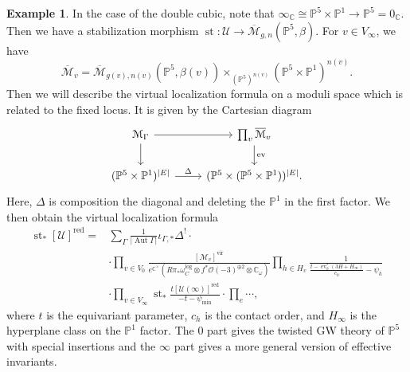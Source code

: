 \documentclass[10pt,oldfontcommands,oneside]{memoir}
\theoremstyle{definition}
\newtheorem{exm}[thm]{Example}
\theoremstyle{remark}
\theoremstyle{plain}
\theoremstyle{definition}
\theoremstyle{remark}
\newcommand{\C}{\mathbb{C}}
\renewcommand{\P}{\mathbb{P}}
\newcommand{\Mbar}{\overline{\mathcal{M}}}
\newcommand{\mc}[1]{\mathcal{#1}}
\newcommand{\mr}[1]{\mathrm{#1}}
\newcommand{\on}[1]{\operatorname{#1}}
\newcommand{\1}{\mathbf{1}}
\newcommand{\2}{\mathbf{2}}
\newcommand{\3}{\mathbf{3}}
\newcommand{\vir}{\mr{vir}}
\newcommand{\red}{\mr{red}}
\DeclareMathOperator{\Aut}{Aut}
\DeclareMathOperator{\ev}{ev}
\begin{document}
\begin{exm}
    In the case of the double cubic, note that $\infty_{\C} \cong \P^5 \times \P^1 \to \P^5 = 0_{\C}$. Then we have a stabilization morphism $\on{st} \colon\mc{U} \to \Mbar_{g,n}(\P^5,\beta)$. For $v \in V_{\infty}$, we have
    \[ \Mbar_v = \Mbar_{g(v), n(v)}(\P^5, \beta(v)) \times_{(\P^5)^{n(v)}} (\P^5 \times \P^1)^{n(v)}. \]
    Then we will describe the virtual localization formula on a moduli space which is related to the fixed locus. It is given by the Cartesian diagram
    \begin{equation*}
    \begin{tikzcd}
        \mc{M}_{\Gamma} \ar{r} \ar{d} & \prod_v \Mbar_v \ar{d}{\ev} \\
        (\P^5 \times \P^1)^{|E|} \ar{r}{\Delta} & (\P^5 \times ( \P^5 \times \P^1 ))^{|E|}.
    \end{tikzcd}
    \end{equation*}
    Here, $\Delta$ is composition the diagonal and deleting the $\P^1$ in the first factor. We then obtain the virtual localization formula
    \begin{align*}
        \on{st}_* [\mc{U}]^{\red} ={}& \sum_{\Gamma} \frac{1}{|\Aut \Gamma|} \iota_{\Gamma,*} \Delta^! \cdot \\
        &\cdot \prod_{v \in V_0} \frac{[\mc{M}_v]^{\vir}}{e^{\C^{\times}}(R\pi_* \omega_C^{\log} \otimes f^* \mc{O}(-3)^{\oplus 2} \otimes \C_{\omega})} \prod_{h \in H_v} \frac{1}{\frac{ t-\ev_h^*(3H+H_{\infty}) }{c_h} - \psi_h} \\
        &\cdot \prod_{v \in V_{\infty}} \on{st}_* \frac{t [\mc{U}(\infty)]^{\red}}{-t-\psi_{\min}} 
        \cdot \prod_{e} \cdots,
    \end{align*}
    where $t$ is the equivariant parameter, $c_h$ is the contact order, and $H_{\infty}$ is the hyperplane class on the $\P^1$ factor. The $0$ part gives the twisted GW theory of $\P^5$ with special insertions and the $\infty$ part gives a more general version of effective invariants.
\end{exm}
\end{document}
